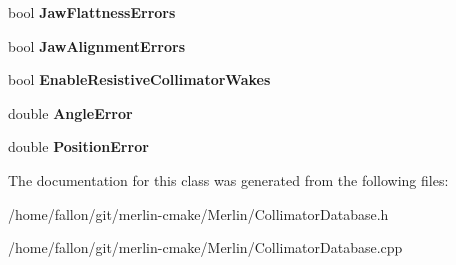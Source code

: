 \begin{DoxyCompactItemize}
\mbox{\label{classCollimatorDatabase_ada2dff3b62ee40ad440b49a031c69cea}} 
bool {\bfseries Jaw\+Flattness\+Errors}
\item 
\mbox{\label{classCollimatorDatabase_a56e1b47ff877e1cbbff3bcdc62e587a9}} 
bool {\bfseries Jaw\+Alignment\+Errors}
\item 
\mbox{\label{classCollimatorDatabase_af4a5410c7927aaaeed7b1cd323010670}} 
bool {\bfseries Enable\+Resistive\+Collimator\+Wakes}
\item 
\mbox{\label{classCollimatorDatabase_ab3bc7c834c40288b5998799a25274457}} 
double {\bfseries Angle\+Error}
\item 
\mbox{\label{classCollimatorDatabase_a1d6fa3b40d99e448b4acb99b8e792673}} 
double {\bfseries Position\+Error}
\end{DoxyCompactItemize}


The documentation for this class was generated from the following files\+:\begin{DoxyCompactItemize}
\item 
/home/fallon/git/merlin-\/cmake/\+Merlin/Collimator\+Database.\+h\item 
/home/fallon/git/merlin-\/cmake/\+Merlin/Collimator\+Database.\+cpp\end{DoxyCompactItemize}
